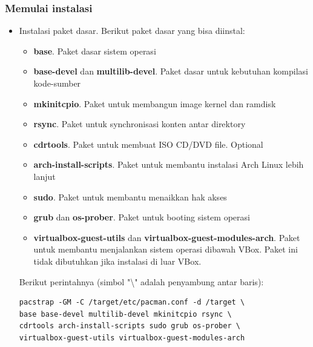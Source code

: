 \documentclass[12pt,]{article}
\begin{document}
	\subsubsection{Memulai instalasi}
	\begin{itemize}
		\item Instalasi paket dasar.
		Berikut paket dasar yang bisa diinstal:
		\begin{itemize}
			\item \textbf{base}. Paket dasar sistem operasi
			\item \textbf{base-devel} dan \textbf{multilib-devel}. Paket dasar untuk kebutuhan kompilasi kode-sumber
			\item \textbf{mkinitcpio}. Paket untuk membangun image kernel dan ramdisk
			\item \textbf{rsync}. Paket untuk synchronisasi konten antar direktory
			\item \textbf{cdrtools}. Paket untuk membuat ISO CD/DVD file. Optional
			\item \textbf{arch-install-scripts}. Paket untuk membantu instalasi Arch Linux lebih lanjut
			\item \textbf{sudo}. Paket untuk membantu menaikkan hak akses
			\item \textbf{grub} dan \textbf{os-prober}. Paket untuk booting sistem operasi
			\item \textbf{virtualbox-guest-utils} dan \textbf{virtualbox-guest-modules-arch}.
			Paket untuk membantu menjalankan sistem operasi dibawah VBox.
			Paket ini tidak dibutuhkan jika instalasi di luar VBox.
		\end{itemize}
		Berikut perintahnya (simbol "\textbackslash" adalah penyambung antar baris):
		\begin{verbatim}
pacstrap -GM -C /target/etc/pacman.conf -d /target \
base base-devel multilib-devel mkinitcpio rsync \
cdrtools arch-install-scripts sudo grub os-prober \
virtualbox-guest-utils virtualbox-guest-modules-arch
		\end{verbatim}
	\end{itemize}
\end{document}
